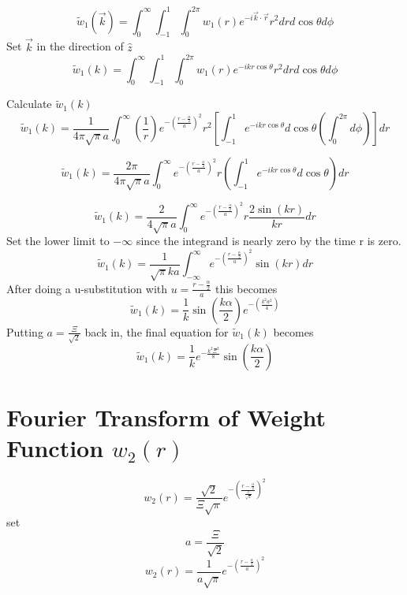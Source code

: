 \documentclass[double,12pt]{beavtex}
\begin{document}
\begin{equation}{\widetilde{w}_1(\vec{k})=\int_{0}^{\infty}\int_{-1}^{1}\int_{0}^{2\pi}w_1(r)e^{-i\vec{k}\cdot{\vec{r}}}r^2d{r}d{\cos\theta}d{\phi}}\end{equation}
Set $\vec{k}$ in the direction of $\hat{z}$ 
\begin{equation}{\widetilde{w}_1(k)=\int_{0}^{\infty}\int_{-1}^{1}\int_{0}^{2\pi}w_1(r)e^{-ikr\cos\theta}r^2d{r}d{\cos\theta}d{\phi}}\end{equation}

\noindent Calculate $\widetilde{w}_1(k)$ 
\begin{equation}{\widetilde{w}_1(k)=\frac{1}{4{\pi}\sqrt{\pi}a}\int_{0}^{\infty}\left(\frac{1}{r}\right)e^{-\left(\frac{r-\frac{\alpha}{2}}{a}\right)^2}r^2\left[\int_{-1}^{1}e^{-ikr\cos\theta}d{\cos\theta}\left(\int_{0}^{2\pi}d{\phi}\right)\right]d{r}}\end{equation}

\begin{equation}{\widetilde{w}_1(k)=\frac{2\pi}{4{\pi}\sqrt{\pi}a}\int_{0}^{\infty}e^{-\left(\frac{r-\frac{\alpha}{2}}{a}\right)^2}r\left(\int_{-1}^{1}e^{-ikr\cos\theta}d{\cos\theta}\right)d{r}}\end{equation}

\begin{equation}{\widetilde{w}_1(k)=\frac{2}{4\sqrt{\pi}a}\int_{0}^{\infty}e^{-\left(\frac{r-\frac{\alpha}{2}}{a}\right)^2}r\frac{2\sin(kr)}{kr}d{r}}\end{equation}
Set the lower limit to $-\infty$ since the integrand is nearly zero by the time r is zero. 
\begin{equation}{\widetilde{w}_1(k)=\frac{1}{\sqrt{\pi}ka}\int_{-\infty}^{\infty}e^{-\left(\frac{r-\frac{\alpha}{2}}{a}\right)^2}\sin(kr)d{r}}\end{equation}
After doing a u-substitution with $u=\frac{r-\frac{\alpha}{2}}{a}$ this becomes
\begin{equation}{\widetilde{w}_1(k)=\frac{1}{k}\sin\left(\frac{k\alpha}{2}\right)e^{-\left(\frac{k^2a^2}{4}\right)}}\end{equation}
Putting $a=\frac{\Xi}{\sqrt{2}}$ back in, the final equation for $\widetilde{w}_1(k)$ becomes
\begin{equation}
    \widetilde{w}_1(k)=\frac{1}{k}e^{-\frac{k^2\Xi^2}{8}}\sin\left(\frac{k\alpha}{2}\right)
\end{equation}

\section{Fourier Transform of Weight Function $w_{2}(r)$}
\begin{equation}{w_2(r)=\frac{\sqrt{2}}{\Xi\sqrt{\pi}}e^{-\left(\frac{r-\frac{\alpha}{2}}{\frac{\Xi}{\sqrt{2}}}\right)^2}}\end{equation}
set 
\begin{equation}{a=\frac{\Xi}{\sqrt{2}}}\end{equation}
\begin{equation}{w_2(r)=\frac{1}{a\sqrt{\pi}}e^{-\left(\frac{r-\frac{\alpha}{2}}{a}\right)^2}}\end{equation}
\end{document}

